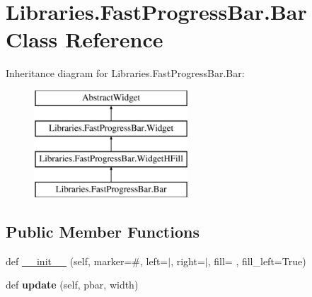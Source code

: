 \hypertarget{class_libraries_1_1_fast_progress_bar_1_1_bar}{}\section{Libraries.\+Fast\+Progress\+Bar.\+Bar Class Reference}
\label{class_libraries_1_1_fast_progress_bar_1_1_bar}
Inheritance diagram for Libraries.\+Fast\+Progress\+Bar.\+Bar\+:\begin{figure}[H]
\begin{center}
\leavevmode
\includegraphics[height=4.000000cm]{class_libraries_1_1_fast_progress_bar_1_1_bar}
\end{center}
\end{figure}
\subsection*{Public Member Functions}
\begin{DoxyCompactItemize}
\item 
def \hyperlink{class_libraries_1_1_fast_progress_bar_1_1_bar_a8bbb0ecd3331b8d6f14efff5604f57a4}{\+\_\+\+\_\+init\+\_\+\+\_\+} (self, marker=\textquotesingle{}\#\textquotesingle{}, left=\textquotesingle{}$\vert$\textquotesingle{}, right=\textquotesingle{}$\vert$\textquotesingle{}, fill=\textquotesingle{} \textquotesingle{}, fill\+\_\+left=True)
\item 
def {\bfseries update} (self, pbar, width)\hypertarget{class_libraries_1_1_fast_progress_bar_1_1_bar_a9861d09ca2ebfbf5de59b1d5d7d167b2}{}\label{class_libraries_1_1_fast_progress_bar_1_1_bar_a9861d09ca2ebfbf5de59b1d5d7d167b2}

\end{DoxyCompactItemize}
